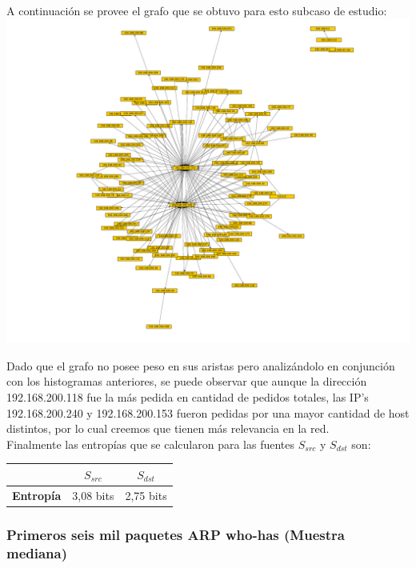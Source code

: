 \indent A continuación se provee el grafo que se obtuvo para esto subcaso de estudio:\\

\includegraphics[scale=0.7,clip=true,trim=140 0 0 0]{graphics/laburochico.pdf}


\indent Dado que el grafo no posee peso en sus aristas pero analizándolo en conjunción con los histogramas anteriores, se puede observar que aunque la dirección 192.168.200.118 fue la más pedida en cantidad de pedidos totales, las IP's 192.168.200.240 y 192.168.200.153 fueron pedidas por una mayor cantidad de host distintos, por lo cual creemos que tienen más relevancia en la red.\\

\indent Finalmente las entropías que se calcularon para las fuentes {$S_{src}$} y $S_{dst}$ son:\\

\begin{centering}
	\begin{tabular}{ | c | c | c |} \hline
	   & \textbf{$S_{src}$} & \textbf{$S_{dst}$} \\ \hline
	  	\textbf{Entropía} & 3,08 bits & 2,75 bits\\ \hline
	\end{tabular}
\end{centering}


\subsubsection{Primeros seis mil paquetes ARP who-has (Muestra mediana)}

